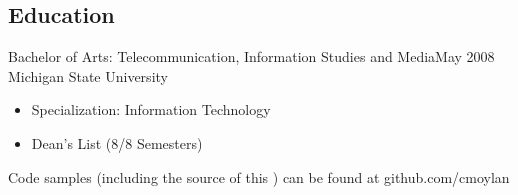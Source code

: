 \documentclass[11pt]{res}
\begin{document}
\begin{resume}


\section{Education}
Bachelor of Arts: Telecommunication, Information Studies and Media\dotfill May 2008\\
Michigan State University
\begin{itemize}
\item Specialization: Information Technology
\item Dean's List (8/8 Semesters)
\end{itemize}





 \hoffset\centerline{\footnotesize Code samples (including the source of this \Resume) can be found at github.com/cmoylan}

\end{resume}
\end{document}
